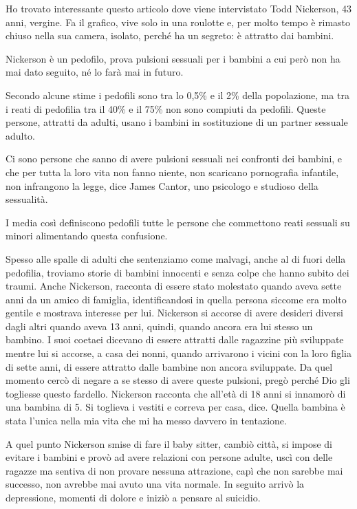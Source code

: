 \documentclass[12pt]{book} %
\begin{document}
Ho trovato interessante questo
articolo dove viene
intervistato Todd Nickerson, 43 anni, vergine. Fa il grafico, vive solo in una roulotte e, per molto tempo è rimasto
chiuso nella sua camera, isolato, perché ha un segreto: è attratto dai bambini.

Nickerson è un pedofilo, prova pulsioni sessuali per i bambini a cui però non ha mai dato seguito, né lo farà mai in
futuro.

Secondo alcune stime i pedofili sono tra lo 0,5\% e il 2\% della popolazione, ma tra i reati di pedofilia tra il 40\% e
il 75\% non sono compiuti da pedofili. Queste persone, attratti da adulti, usano i bambini in sostituzione di un
partner sessuale adulto.

{\textquotedbl}Ci sono persone che sanno di avere pulsioni sessuali nei confronti dei bambini, e che per tutta la loro
vita non fanno niente, non scaricano pornografia infantile, non infrangono la legge,{\textquotedbl} dice James Cantor,
uno psicologo e studioso della sessualità.

I media così definiscono pedofili tutte le persone che commettono reati sessuali su minori alimentando questa
confusione.

Spesso alle spalle di adulti che sentenziamo come malvagi, anche al di fuori della pedofilia, troviamo storie di bambini
innocenti e senza colpe che hanno subito dei traumi. Anche Nickerson, racconta di essere stato molestato quando aveva
sette anni da un amico di famiglia, identificandosi in quella persona siccome era molto gentile e mostrava interesse
per lui. Nickerson si accorse di avere desideri diversi dagli altri quando aveva 13 anni, quindi, quando ancora era lui
stesso un bambino. I suoi coetaei dicevano di essere attratti dalle ragazzine più sviluppate mentre lui si accorse, a
casa dei nonni, quando arrivarono i vicini con la loro figlia di sette anni, di essere attratto dalle bambine non
ancora sviluppate. Da quel momento cercò di negare a se stesso di avere queste pulsioni, pregò perché Dio gli togliesse
questo fardello. Nickerson racconta che all'età di 18 anni si innamorò di una bambina di 5. {\textquotedbl}Si toglieva
i vestiti e correva per casa,{\textquotedbl} dice. {\textquotedbl}Quella bambina è stata l'unica nella mia vita che mi
ha messo davvero in tentazione.{\textquotedbl}

A quel punto Nickerson smise di fare il baby sitter, cambiò città, si impose di evitare i bambini e provò ad avere
relazioni con persone adulte, uscì con delle ragazze ma sentiva di non provare nessuna attrazione, capì che non sarebbe
mai successo, non avrebbe mai avuto una vita normale. In seguito arrivò la depressione, momenti di dolore e iniziò a
pensare al suicidio.
\end{document}
